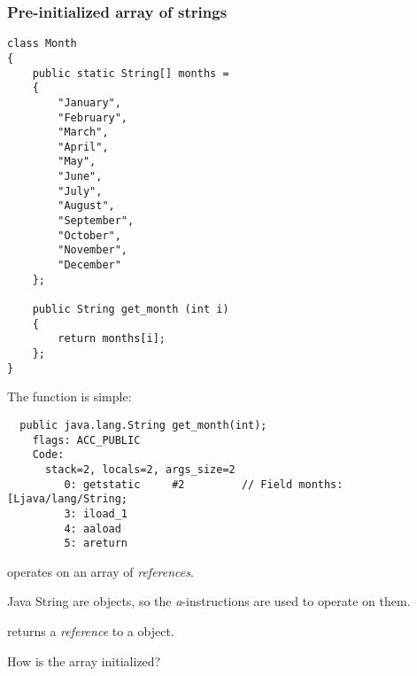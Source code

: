 \subsubsection{Pre-initialized array of strings}
\label{Java_2D_array_month}

\begin{lstlisting}[style=customjava]
class Month
{
	public static String[] months = 
	{
		"January", 
		"February", 
		"March", 
		"April",
		"May",
		"June",
		"July",
		"August",
		"September",
		"October",
		"November",
		"December"
	};

	public String get_month (int i)
	{
		return months[i];
	};
} 
\end{lstlisting}

The  function is simple:

\begin{lstlisting}
  public java.lang.String get_month(int);
    flags: ACC_PUBLIC
    Code:
      stack=2, locals=2, args_size=2
         0: getstatic     #2         // Field months:[Ljava/lang/String;
         3: iload_1       
         4: aaload        
         5: areturn       
\end{lstlisting}

 operates on an array of \emph{references}.

Java String are objects, so the \emph{a}-instructions are used to operate on them.

 returns a \emph{reference} to a  object.


How is the  array initialized?


